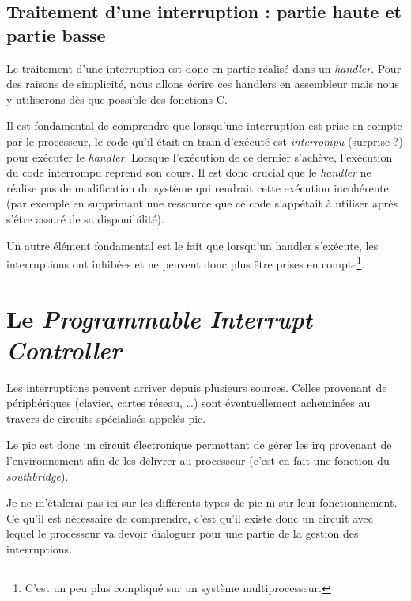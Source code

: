\begin{itemize}
%
\subsection{Traitement d'une interruption : partie haute et partie basse}

    Le traitement d'une interruption est donc en partie réalisé dans
un {\em handler}. Pour des raisons de simplicité, nous allons écrire
ces handlers en assembleur mais nous y utiliserons dès que possible
des fonctions C.

   Il est fondamental de comprendre que lorsqu'une interruption est
prise en compte par le processeur, le code qu'il était en train
d'exécuté est {\em interrompu} (surprise ?) pour exécuter le {\em
  handler}. Lorsque l'exécution de ce dernier s'achève, l'exécution du
code interrompu reprend son cours. Il est donc crucial que le {\em
  handler} ne réalise pas de modification du système qui rendrait
cette exécution incohérente (par exemple en supprimant une ressource
que ce code s'appétait à utiliser après s'être assuré de sa
disponibilité).

   Un autre élément fondamental est le fait que lorsqu'un handler
s'exécute, les interruptions ont inhibées et ne peuvent donc plus être
prises en compte\footnote{C'est un peu plus compliqué sur un système
  multiprocesseur.}. 

%      
\section{Le {\em Programmable Interrupt Controller}}

   Les interruptions peuvent arriver depuis plusieurs sources. Celles
provenant de périphériques (clavier, cartes réseau, \ldots) sont
éventuellement acheminées au travers de circuits spécialisés appelés
{\sc pic}.

   Le {\sc pic} est donc un circuit électronique permettant de gérer les
{\sc irq} provenant de l'environnement afin de les délivrer au
processeur (c'est en fait une fonction du {\em southbridge}).

   Je ne m'étalerai pas ici sur les différents types de {\sc pic} ni
sur leur fonctionnement. Ce qu'il est nécessaire de comprendre, c'est
qu'il existe donc un circuit avec lequel le processeur va devoir
dialoguer pour une partie de la gestion des interruptions.


\end{itemize}
